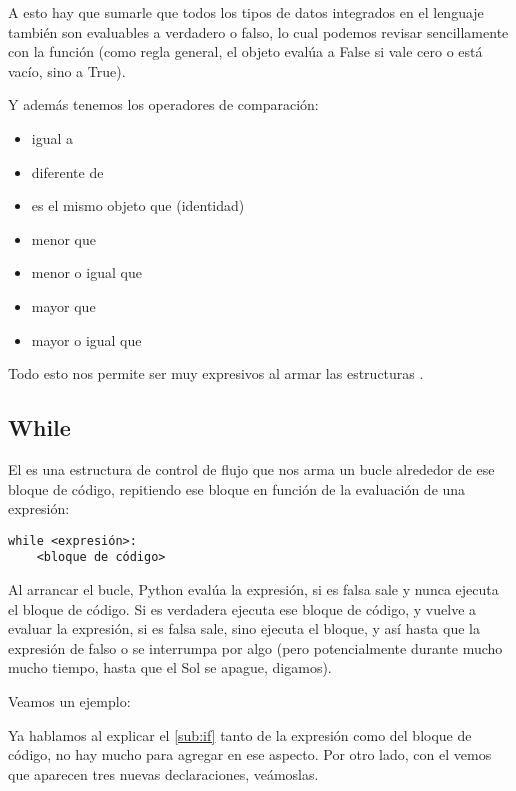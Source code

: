A esto hay que sumarle que todos los tipos de datos integrados en el lenguaje también son evaluables a verdadero o falso, lo cual podemos revisar sencillamente con la función  (como regla general, el objeto evalúa a False si vale cero o está vacío, sino a True).


Y además tenemos los operadores de comparación:

\begin{itemize}
\item \mip{==} igual a
\item \mip{!=} diferente de
\item {} es el mismo objeto que (identidad)
\item \mip{<} menor que
\item \mip{<=} menor o igual que
\item \mip{>} mayor que
\item \mip{>=} mayor o igual que
\end{itemize}

Todo esto nos permite ser muy expresivos al armar las estructuras . 


\subsection{While}\label{sub:while}

El  es una estructura de control de flujo que nos arma un bucle alrededor de ese bloque de código, repitiendo ese bloque en función de la evaluación de una expresión:

\begin{verbatim}
while <expresión>:
    <bloque de código>
\end{verbatim}

Al arrancar el bucle, Python evalúa la expresión, si es falsa sale y nunca ejecuta el bloque de código. Si es verdadera ejecuta ese bloque de código, y vuelve a evaluar la expresión, si es falsa sale, sino ejecuta el bloque, y así hasta que la expresión de falso o se interrumpa por algo (pero potencialmente durante mucho mucho tiempo, hasta que el Sol se apague, digamos).

Veamos un ejemplo:


Ya hablamos al explicar el  \ref{sub:if} tanto de la expresión como del bloque de código, no hay mucho para agregar en ese aspecto. Por otro lado, con el  vemos que aparecen tres nuevas declaraciones, veámoslas.

